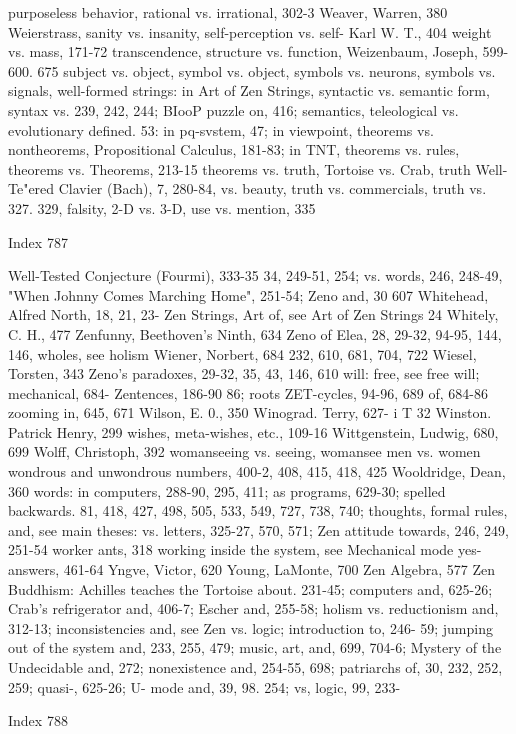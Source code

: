 purposeless behavior, rational vs. irrational,   302-3 Weaver, Warren, 380 Weierstrass,
sanity vs. insanity, self-perception vs. self-   Karl W. T., 404 weight vs. mass, 171-72
transcendence, structure vs. function,           Weizenbaum, Joseph, 599-600. 675
subject vs. object, symbol vs. object,
symbols vs. neurons, symbols vs. signals,        well-formed strings: in Art of Zen Strings,
syntactic vs. semantic form, syntax vs.          239, 242, 244; BIooP puzzle on, 416;
semantics, teleological vs. evolutionary         defined. 53: in pq-svstem, 47; in
viewpoint, theorems vs. nontheorems,             Propositional Calculus, 181-83; in TNT,
theorems vs. rules, theorems vs. Theorems,       213-15
theorems vs. truth, Tortoise vs. Crab, truth     Well-Te"ered Clavier (Bach), 7, 280-84,
vs. beauty, truth vs. commercials, truth vs.     327. 329,
falsity, 2-D vs. 3-D, use vs. mention,           335



Index                                                                                   787

Well-Tested Conjecture (Fourmi), 333-35       34, 249-51, 254; vs. words, 246, 248-49,
"When Johnny Comes Marching Home",            251-54; Zeno and, 30
607 Whitehead, Alfred North, 18, 21, 23-      Zen Strings, Art of, see Art of Zen Strings
24 Whitely, C. H., 477                        Zenfunny, Beethoven's Ninth, 634
                                              Zeno of Elea, 28, 29-32, 94-95, 144, 146,
wholes, see holism Wiener, Norbert, 684 232, 610, 681, 704, 722
Wiesel, Torsten, 343                          Zeno's paradoxes, 29-32, 35, 43, 146, 610
will: free, see free will; mechanical, 684- Zentences, 186-90
86; roots                                     ZET-cycles, 94-96, 689
of, 684-86                                    zooming in, 645, 671
Wilson, E. 0., 350 Winograd. Terry, 627- i T
32 Winston. Patrick Henry, 299 wishes,
meta-wishes, etc., 109-16 Wittgenstein,
Ludwig, 680, 699
Wolff, Christoph, 392
womanseeing vs. seeing, womansee men
vs. women wondrous and unwondrous
numbers, 400-2, 408,
415, 418, 425
Wooldridge, Dean, 360
words: in computers, 288-90, 295, 411; as
programs, 629-30; spelled backwards. 81,
418, 427, 498, 505, 533, 549, 727, 738,
740; thoughts, formal rules, and, see main
theses: vs. letters,
325-27, 570, 571; Zen attitude towards,
246, 249, 251-54
worker ants, 318
working inside the system, see Mechanical
mode
yes-answers, 461-64 Yngve, Victor, 620
Young, LaMonte, 700
Zen Algebra, 577
Zen Buddhism: Achilles teaches the
Tortoise about. 231-45; computers and,
625-26; Crab's refrigerator and, 406-7;
Escher      and,     255-58;   holism     vs.
reductionism and, 312-13; inconsistencies
and, see Zen vs. logic; introduction to, 246-
59; jumping out of the system and, 233,
255, 479; music, art, and, 699, 704-6;
Mystery of the Undecidable and, 272;
nonexistence and, 254-55, 698; patriarchs
of, 30, 232, 252, 259; quasi-, 625-26; U-
mode and, 39, 98. 254; vs, logic, 99, 233-




Index                                                                                788



